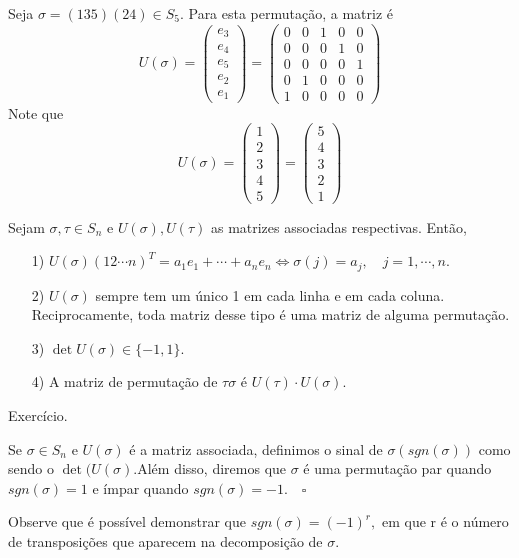 \documentclass[algebra_notes.tex]{subfiles}
\begin{document}
\begin{example*}
	Seja $\sigma = (135)(24)\in S_{5}.$ Para esta permutação, a matriz é
	$$
		U(\sigma) =
		\begin{pmatrix}
			e_{3} \\
			e_{4} \\
			e_{5} \\
			e_{2} \\
			e_{1}
		\end{pmatrix} =
		\begin{pmatrix}
			0 & 0 & 1 & 0 & 0 \\
			0 & 0 & 0 & 1 & 0 \\
			0 & 0 & 0 & 0 & 1 \\
			0 & 1 & 0 & 0 & 0 \\
			1 & 0 & 0 & 0 & 0
		\end{pmatrix}
	$$
	Note que
	$$
		U(\sigma) = \begin{pmatrix}
			1 \\
			2 \\
			3 \\
			4 \\
			5
		\end{pmatrix} =
		\begin{pmatrix}
			5 \\
			4 \\
			3 \\
			2 \\
			1
		\end{pmatrix}
	$$
\end{example*}
\begin{prop*}
	Sejam $\sigma, \tau\in S_{n}$ e $U(\sigma), U(\tau)$ as matrizes associadas respectivas. Então,
	\begin{itemize}
		\item[1)] $U(\sigma)(12 \cdots n)^{T} = a_{1}e_{1} + \cdots + a_{n}e_{n} \Longleftrightarrow \sigma(j) = a_{j},\quad j = 1, \cdots, n.$
		\item[2)] $U(\sigma)$ sempre tem um único 1 em cada linha e em cada coluna. Reciprocamente, toda matriz desse tipo
		      é uma matriz de alguma permutação.
		\item[3)] $\det{U(\sigma)}\in\{-1, 1\}.$
		\item[4)] A matriz de permutação de $\tau\sigma$ é $U(\tau)\cdot U(\sigma)$.
	\end{itemize}
\end{prop*}
\begin{proof*}
	Exercício.
\end{proof*}
\begin{def*}
	Se $\sigma\in S_{n}$ e $U(\sigma)$ é a matriz associada, definimos o sinal de $\sigma (sgn(\sigma))$ como sendo o
	$\det{(U(\sigma)}.$Além disso, diremos que $\sigma$ é uma permutação par quando $sgn(\sigma) = 1$ e ímpar quando
	$sgn(\sigma) = -1.\quad\square$
\end{def*}
Observe que é possível demonstrar que $sgn(\sigma) = (-1)^{r},$ em que r é o número de transposições que aparecem
na decomposição de $\sigma.$
\end{document}
